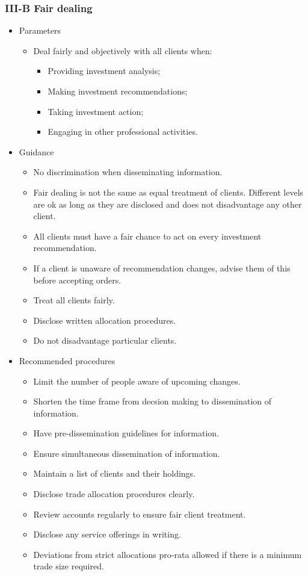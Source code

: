 \documentclass[../notes_compiled.tex]{subfiles}
\begin{document}
\subsubsection{III-B Fair dealing}
\begin{itemize}
\item Parameters
\begin{itemize}
\item Deal fairly and objectively with all clients when:
\begin{itemize}
\item Providing investment analysis;
\item Making investment recommendations;
\item Taking investment action;
\item Engaging in other professional activities.
\end{itemize}
\end{itemize}
\item Guidance
\begin{itemize}
\item No discrimination when disseminating information.
\item Fair dealing is not the same as equal treatment of clients. Different levels are ok as long as they are disclosed and does not disadvantage any other client.
\item All clients must have a fair chance to act on every investment recommendation.
\item If a client is unaware of recommendation changes, advise them of this before accepting orders.
\item Treat all clients fairly.
\item Disclose written allocation procedures.
\item Do not disadvantage particular clients.
\end{itemize}
\item Recommended procedures
\begin{itemize}
\item Limit the number of people aware of upcoming changes.
\item Shorten the time frame from decsion making to dissemination of information.
\item Have pre-dissemination guidelines for information.
\item Ensure simultaneous dissemination of information.
\item Maintain a list of clients and their holdings.
\item Disclose trade allocation procedures clearly.
\item Review accounts regularly to ensure fair client treatment.
\item Disclose any service offerings in writing.
\item Deviations from strict allocations pro-rata allowed if there is a minimum trade size required.
\end{itemize}
\end{itemize}
\end{document}

